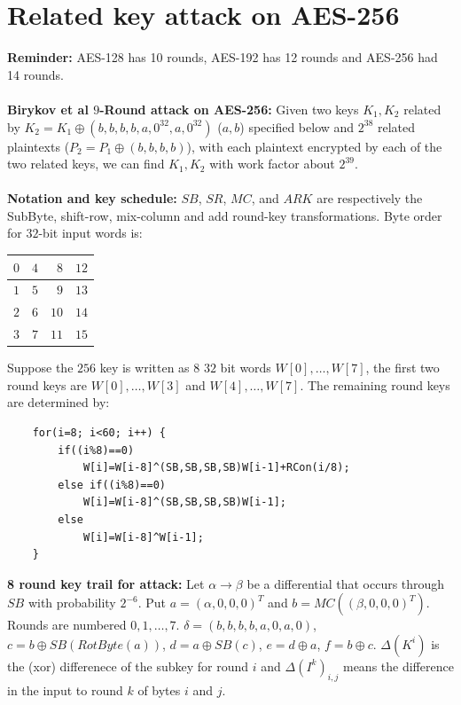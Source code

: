 \section{Related key attack on AES-256}
{\bf Reminder:} AES-128 has 10 rounds, AES-192 has 12 rounds and AES-256 had 14 rounds.
\\
\\
{\bf Birykov et al $9$-Round attack on AES-256:}
Given
two keys $K_1, K_2$ related by $K_2= K_1 \oplus (b,b,b,b,a,0^{32},a,0^{32})$ ($a, b$) specified
below and $2^{38}$ related plaintexts ($P_2= P_1 \oplus (b,b,b,b)$), with each plaintext
encrypted by each of the two related keys, we can find $K_1, K_2$ with work factor about $2^{39}$.
\\
\\
{\bf Notation and key schedule:}  $SB$, $SR$, $MC$, and $ARK$ are respectively the SubByte,
shift-row, mix-column and add round-key transformations.  Byte order for $32$-bit input words is:
\begin{center}
\begin{tabular} {|r|r|r|r|}
\hline
$0$ & $4$ & $8$ & $12$ \\
\hline
$1$ & $5$ & $9$ & $13$ \\
\hline
$2$ & $6$ & $10$ & $14$ \\
\hline
$3$ & $7$ & $11$ & $15$ \\
\hline
\end{tabular}
\end{center}
Suppose the $256$ key is written as $8$ $32$ bit words $W[0], \ldots, W[7]$, the first
two round keys are 
$W[0], \ldots, W[3]$ and
$W[4], \ldots, W[7]$.  The remaining round keys are determined by:
\begin{verbatim}
    for(i=8; i<60; i++) {
        if((i%8)==0)
            W[i]=W[i-8]^(SB,SB,SB,SB)W[i-1]+RCon(i/8);
        else if((i%8)==0)
            W[i]=W[i-8]^(SB,SB,SB,SB)W[i-1];
        else
            W[i]=W[i-8]^W[i-1];
    }
\end{verbatim}
{\bf 8 round key trail for attack:} Let $\alpha \rightarrow \beta$ be a differential
that occurs through $SB$ with probability $2^{-6}$.  Put 
$a=(\alpha,0,0,0)^T$ and
$b=MC((\beta,0,0,0)^T)$.  Rounds are numbered $0, 1, \ldots ,7$.
$\delta= (b,b,b,b,a,0,a,0)$, $c= b \oplus SB(RotByte(a))$, $d= a \oplus SB(c)$, $e= d \oplus a$,
$f=b \oplus c$.  $\Delta(K^i)$ is the (xor) differenece of the subkey for round $i$ and
$\Delta(I^k)_{i,j}$ means the difference in the input to round $k$ of bytes $i$ and $j$.
\\

